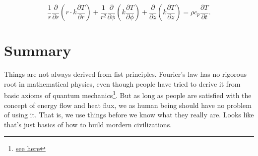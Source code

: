 \begin{equation}
    \frac{1}{r} \frac{\partial}{\partial r}\left(r \cdot k \frac{\partial T}{\partial r}\right)+\frac{1}{r^{2}} \frac{\partial}{\partial \phi}\left(k \frac{\partial T}{\partial \phi}\right)+\frac{\partial}{\partial z}\left(k \frac{\partial T}{\partial z}\right)=\rho c_p \frac{\partial T}{\partial t}.
    \label{eq2-16}
\end{equation}

\section{Summary}

Things are not always derived from fist principles. Fourier's law has no rigorous root in mathematical physics, even though people have tried to derive it from basic axioms of quantum mechanics\footnote{\href{https://journals.aps.org/pre/abstract/10.1103/PhysRevE.79.042101}{see here}}. But as long as people are satisfied with the concept of energy flow and heat flux, we as human being should have no problem of using it. That is, we use things before we know what they really are. Looks like that's just basics of how to build mordern civilizations.